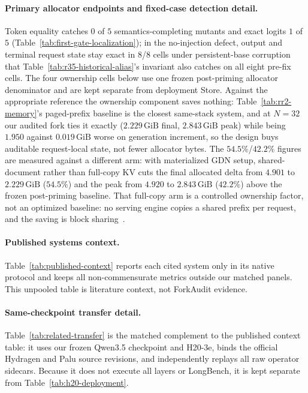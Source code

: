 \documentclass{article}
\newcommand{\gib}{\,\mathrm{GiB}}
\begin{document}
\paragraph{Primary allocator endpoints and fixed-case detection detail.}
Token equality catches $0$ of $5$ semantics-completing mutants and exact logits
$1$ of $5$ (Table~\ref{tab:first-gate-localization}); in the no-injection
defect, output and terminal request state stay exact in 8/8 cells under
persistent-base corruption that Table~\ref{tab:r35-historical-alias}'s invariant
also catches on all eight pre-fix cells.  The four ownership cells below use one
frozen post-priming allocator denominator and are kept separate from deployment
Store.
Against the appropriate reference the ownership component saves nothing:
Table~\ref{tab:rr2-memory}'s paged-prefix baseline is the closest same-stack
system, and at $N=32$ our audited fork ties it exactly ($2.229\gib$ final,
$2.843\gib$ peak) while being $1.950$ against $0.019\gib$ worse on generation
increment, so the design buys auditable request-local state, not fewer allocator
bytes.  The $54.5\%$/$42.2\%$ figures are measured against a different arm: with
materialized GDN setup, shared-document rather than full-copy KV cuts the final allocated
delta from $4.901$ to $2.229\gib$ ($54.5\%$) and the peak from $4.920$ to
$2.843\gib$ ($42.2\%$) above the frozen post-priming baseline.  That full-copy
arm is a controlled ownership factor, not an optimized baseline: no serving
engine copies a shared prefix per request, and the saving is block
sharing~\citep{kwon2023pagedattention}.


\paragraph{Published systems context.}
Table~\ref{tab:published-context} reports each cited system only in its native
protocol and keeps all non-commensurate metrics outside our matched panels.
This unpooled table is literature context, not ForkAudit evidence.


\paragraph{Same-checkpoint transfer detail.}
Table~\ref{tab:related-transfer} is the matched complement to the published
context table: it uses our frozen Qwen3.5 checkpoint and H20-3e, binds the
official Hydragen and Palu source revisions, and independently replays all raw
operator sidecars.  Because it does not execute all layers or LongBench, it is
kept separate from Table~\ref{tab:h20-deployment}.

\end{document}
